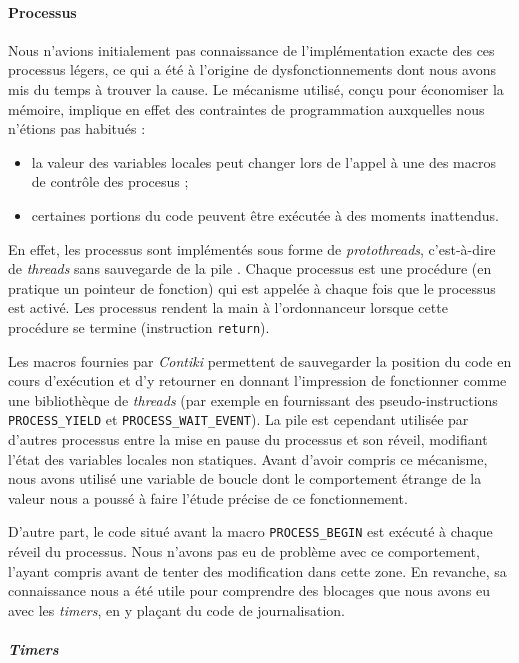 \paragraph{Processus}

Nous n’avions initialement pas connaissance de l’implémentation exacte des ces processus légers, ce qui a été à l’origine de dysfonctionnements dont nous avons mis du temps à trouver la cause.
Le mécanisme utilisé, conçu pour économiser la mémoire, implique en effet des contraintes de programmation auxquelles nous n’étions pas habitués :
\begin{itemize}
	\item la valeur des variables locales peut changer lors de l’appel à une des macros de contrôle des procesus ;
	\item certaines portions du code peuvent être exécutée à des moments inattendus.
\end{itemize}

En effet, les processus sont implémentés sous forme de \emph{protothreads}, c’est-à-dire de \emph{threads} sans sauvegarde de la pile .
Chaque processus est une procédure (en pratique un pointeur de fonction) qui est appelée à chaque fois que le processus est activé.
Les processus rendent la main à l’ordonnanceur lorsque cette procédure se termine (instruction \texttt{return}).

Les macros fournies par \emph{Contiki} permettent de sauvegarder la position du code en cours d’exécution et d’y retourner en donnant l’impression de fonctionner comme une bibliothèque de \emph{threads} (par exemple en fournissant des pseudo-instructions \texttt{PROCESS\_YIELD} et \texttt{PROCESS\_WAIT\_EVENT}).
La pile est cependant utilisée par d’autres processus entre la mise en pause du processus et son réveil, modifiant l’état des variables locales non statiques.
Avant d’avoir compris ce mécanisme, nous avons utilisé une variable de boucle dont le comportement étrange de la valeur nous a poussé à faire l’étude précise de ce fonctionnement.

D’autre part, le code situé avant la macro \texttt{PROCESS\_BEGIN} est exécuté à chaque réveil du processus.
Nous n’avons pas eu de problème avec ce comportement, l’ayant compris avant de tenter des modification dans cette zone.
En revanche, sa connaissance nous a été utile pour comprendre des blocages que nous avons eu avec les \emph{timers}, en y plaçant du code de journalisation.

\paragraph{\emph{Timers}}

